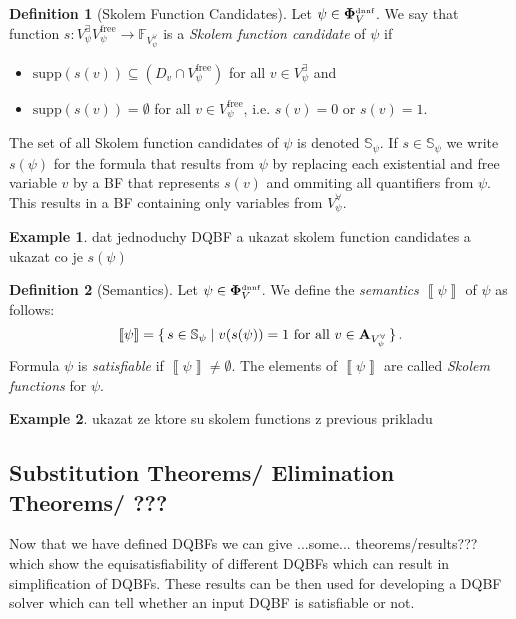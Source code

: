 \documentclass[
  digital, %
  twoside, %
  table,   %
  nolof,     %
  nolot,     %
]{fithesis3}
\let\setbuilder\set
\newcommand{\simpleset}[1]{\{{#1}\}}
\renewcommand{\set}[1]{\normalexpandarg\IfSubStr{#1}{|}{\setbuilder{#1}}{\simpleset{#1}}}
\theoremstyle{definition}
\newtheorem{definition}{Definition}
\newtheorem{example}{Example}
\theoremstyle{remark}
\newcommand{\seman}[1]{\left\llbracket {#1} \right\rrbracket}
\newcommand{\DQBF}[1]{\mathbf{\Phi}_{#1}^{\text{\tiny dnnf}}}
\newcommand{\valtns}[1]{\mathbf{A}_{#1}}
\newcommand{\BFuncs}[1]{\mathbb{F}_{#1}}
\newcommand{\evars}[1]{V_{#1}^{\exists}}
\newcommand{\uvars}[1]{V_{#1}^{\forall}}
\newcommand{\fvars}[1]{V_{#1}^{\text{free}}}
\newcommand{\supp}[1]{\text{supp}(#1)}
\newcommand{\Scands}[1]{\mathbb{S}_{#1}}
\begin{document}
\begin{definition}[Skolem Function Candidates]
  Let $\psi \in \DQBF{V}$. We say that function $s\colon \evars{\psi} \fvars{\psi} \to \BFuncs{\uvars{\psi}}$ is a \emph{Skolem function candidate} of $\psi$ if
  \begin{itemize}
      \item $\supp{s(v)} \subseteq (D_v \cap \fvars{\psi})$ for all $v \in \evars{\psi}$ and
      \item $\supp{s(v)} = \emptyset$ for all $v \in \fvars{\psi}$, i.e. $s(v)=0$ or $s(v)=1$.
  \end{itemize}
\end{definition}
The set of all Skolem function candidates of $\psi$ is denoted $\Scands{\psi}$. If $s \in \Scands{\psi}$ we write $s(\psi)$ for the formula that results from $\psi$ by replacing each existential and free variable $v$ by a BF that represents $s(v)$ and ommiting all quantifiers from $\psi$. This results in a BF containing only variables from $\uvars{\psi}$.
\begin{example}
dat jednoduchy DQBF a ukazat skolem function candidates a ukazat co je $s(\psi)$
\end{example}
\begin{definition}[Semantics]
  Let $\psi \in \DQBF{V}$. We define the \emph{semantics} $\seman{\psi}$ of $\psi$ as follows:
  \[\seman{\psi} = \set{s \in \Scands{\psi} | v(s(\psi))=1 \text{ for all } v \in \valtns{\uvars{\psi}}}.\]
  Formula $\psi$ is \emph{satisfiable} if $\seman{\psi} \not= \emptyset$. The elements of $\seman{\psi}$ are called \emph{Skolem functions} for $\psi$.
\end{definition}
\begin{example}
ukazat ze ktore su skolem functions z previous prikladu
\end{example}

\subsection{Substitution Theorems/ Elimination Theorems/ ???}
Now that we have defined DQBFs we can give ...some... theorems/results??? which show the equisatisfiability of different DQBFs which can result in simplification of DQBFs. These results can be then used for developing a DQBF solver which can tell whether an input DQBF is satisfiable or not.

\end{document}
